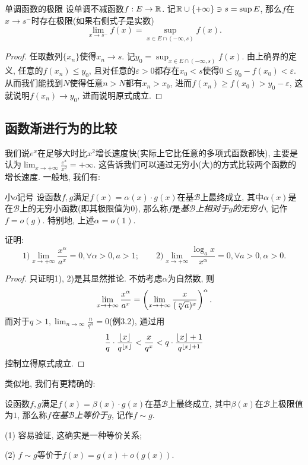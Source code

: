 \begin{theorem}{单调函数的极限}{\label{thm:djdnhjuudejixm}}
	设单调不减函数$f:E \to \mathbb{R}$. 记$\mathbb{R} \cup \{+\infty \} \ni s = \sup E$, 那么$f$在$x \to s^-$时存在极限(如果右侧式子是实数)$$\lim_{x \to s^-} f(x) = \sup_{x \in E \cap (-\infty ,s)} f(x) .$$
\end{theorem}
\begin{proof}
	任取数列$\{ x_n \}$使得$x_n \to s$. 记$y_0 = \sup_{x \in E \cap (-\infty ,s)} f(x)$. 由上确界的定义, 任意的$f(x_n) \leq y_0$, 且对任意的$\varepsilon >0$都存在$x_0 < s$使得$0 \leq y_0-f(x_0) <\varepsilon$. 从而我们能找到$N$使得任意$n>N$都有$x_n>x_0$, 进而$f(x_n) \geq f(x_0) > y_0-\varepsilon$, 这就说明$f(x_n) \to y_0$, 进而说明原式成立. 
\end{proof}

\subsection{函数渐进行为的比较}

我们说$e^x$在足够大时比$x^2$增长速度快(实际上它比任意的多项式函数都快), 主要是认为$\lim_{x\to +\infty} \frac{e^x}{x^2} = +\infty$. 这告诉我们可以通过无穷小(大)的方式比较两个函数的增长速度. 一般地, 我们有: 

\begin{definition}{小$o$记号}
	设函数$f,g$满足$f(x) = \alpha (x) \cdot g(x)$在基$\mathcal{B}$上最终成立, 其中$\alpha (x)$是在$\mathcal{B}$上的无穷小函数(即其极限值为$0$), 那么称$f$是\textit{基$\mathcal{B}$上相对于$g$的无穷小}, 记作$f=o(g)$. 特别地, 上述$\alpha = o(1)$. 
\end{definition}

\begin{example}
	证明: $$1) \lim_{x \to +\infty} \frac{x^{\alpha}}{a^x}=0, \forall \alpha >0, a>1; \qquad 2) \lim_{x \to +\infty} \frac{\log_a x}{x^{\alpha}} = 0, \forall a>0, \alpha >0. $$
\end{example}
\begin{proof}
	只证明1), 2)是其显然推论. 不妨考虑$\alpha$为自然数, 则$$\lim_{x \to +\infty} \frac{x^{\alpha}}{a^x} =  \left( \lim_{x \to +\infty} \frac{x}{(\sqrt[\alpha]{a})^x}  \right)^{\alpha}. $$
	而对于$q>1, \lim_{n\to \infty} \frac{n}{q^n} = 0$(例3.2), 通过用$$\frac{1}{q} \cdot\frac{\lfloor x \rfloor}{q^{\lfloor x \rfloor}} < \frac{x}{q^x} < q \cdot \frac{\lfloor x \rfloor+1}{q^{\lfloor x \rfloor+1}}$$控制立得原式成立. 
\end{proof}

类似地, 我们有更精确的: 

\begin{definition}{}
	设函数$f,g$满足$f(x) = \beta (x) \cdot g(x)$在基$\mathcal{B}$上最终成立, 其中$\beta (x)$在$\mathcal{B}$上极限值为$1$, 那么称$f$\textit{在基$\mathcal{B}$上等价于$g$}, 记作$f \sim g$. 
\end{definition}
\begin{remark}
	(1) 容易验证, 这确实是一种等价关系;
	
	(2) $f \sim g$等价于$f(x) = g(x) + o(g(x))$. 
\end{remark}

